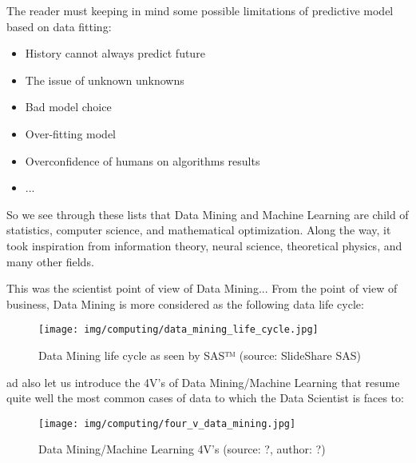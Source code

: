 	The reader must keeping in mind some possible limitations of predictive model based on data fitting:
	\begin{itemize}
		\item History cannot always predict future
		\item The issue of unknown unknowns
		\item Bad model choice
		\item Over-fitting model
		\item Overconfidence of humans on algorithms results
		\item ...
	\end{itemize}
	So we see through these lists that Data Mining and Machine Learning are child of statistics, computer science, and mathematical optimization. Along the way, it took inspiration from information theory, neural science, theoretical physics, and many other fields.
	
	This was the scientist point of view of Data Mining... From the point of view of business, Data Mining is more considered as the following data life cycle:
	\begin{figure}[H]
		\centering
		\texttt{[image: img/computing/data\_mining\_life\_cycle.jpg]}
		\caption[Data Mining life cycle as seen by SAS™]{Data Mining life cycle as seen by SAS™ (source: SlideShare SAS)}
	\end{figure}
	ad also let us introduce the 4V's of Data Mining/Machine Learning that resume quite well the most common cases of data to which the Data Scientist is faces to:
	\begin{figure}[H]
		\centering
		\texttt{[image: img/computing/four\_v\_data\_mining.jpg]}
		\caption[Data Mining/Machine Learning 4V's]{Data Mining/Machine Learning 4V's (source: ?, author: ?)}
	\end{figure}
	
